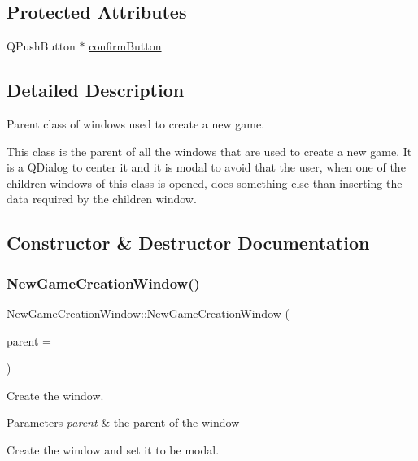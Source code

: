 \subsection*{Protected Attributes}
\begin{DoxyCompactItemize}
\item 
Q\+Push\+Button $\ast$ \hyperlink{classNewGameCreationWindow_a8d0d915f4fb0df24683813e33442219b}{confirm\+Button}
\end{DoxyCompactItemize}


\subsection{Detailed Description}
Parent class of windows used to create a new game. 

This class is the parent of all the windows that are used to create a new game. It is a Q\+Dialog to center it and it is modal to avoid that the user, when one of the children windows of this class is opened, does something else than inserting the data required by the children window. 

\subsection{Constructor \& Destructor Documentation}
\mbox{\label{classNewGameCreationWindow_a1b8cd9166289a086a951c2ee9d6bfebe}} 
\subsubsection{\texorpdfstring{New\+Game\+Creation\+Window()}{NewGameCreationWindow()}}
{\footnotesize\ttfamily New\+Game\+Creation\+Window\+::\+New\+Game\+Creation\+Window (\begin{DoxyParamCaption}\item[{Q\+Widget $\ast$}]{parent = {} }\end{DoxyParamCaption})}



Create the window. 


\begin{DoxyParams}{Parameters}
{\em parent} & the parent of the window\\
\hline
\end{DoxyParams}
Create the window and set it to be modal. 

